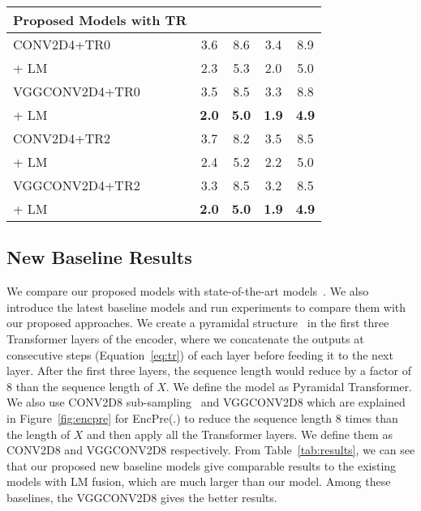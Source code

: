 \documentclass{article}
\begin{document}
\begin{table*}[ht]
\begin{center}
\begin{small}
\begin{sc}
\begin{tabular}{lcccc}
\hline
    Proposed Models with TR &&&& \\ \hline
    CONV2D4+TR0  &3.6 & 8.6 &3.4  & 8.9 \\
    \hspace{0.5cm}   + LM &2.3 &5.3 &2.0 &5.0\\
    VGGCONV2D4+TR0 & 3.5&8.5 & 3.3 & 8.8 \\
    \hspace{0.5cm}   + LM &\textbf{2.0} &\textbf{5.0} &\textbf{1.9} &\textbf{4.9}\\
    CONV2D4+TR2 &3.7 & 8.2 & 3.5 & 8.5 \\
    \hspace{0.5cm}   + LM &2.4 &5.2 &2.2 &5.0\\
    VGGCONV2D4+TR2 &3.3 & 8.5 & 3.2 & 8.5 \\
    \hspace{0.5cm}   + LM &\textbf{2.0} &\textbf{5.0} &\textbf{1.9} &\textbf{4.9}\\
\bottomrule
\end{tabular}
\end{sc}
\end{small}
\end{center}
\vskip -0.1in
\end{table*}

\subsection{New Baseline Results}
We compare our proposed models with  state-of-the-art models~\citep{moritz2020,specaugment,karita2019asru,wang2020a,wang2020b,rwth,e2e2020}. We also introduce the latest baseline models and run experiments to compare them with our proposed approaches. We create a pyramidal structure~\citep{chan2016listen} in the first three Transformer layers of the encoder, where we concatenate the outputs at consecutive steps (Equation~\ref{eq:tr}) of each layer before feeding it to the next layer. After the first three layers, the sequence length would reduce by a factor of 8 than the sequence length of $X$. We define the model as Pyramidal Transformer. We also use CONV2D8 sub-sampling~\citep{espnet} and VGGCONV2D8 which are explained in Figure~\ref{fig:encpre} for EncPre(.) to reduce the sequence length 8 times than the length of $X$ and then apply all the Transformer layers. We define them as  CONV2D8 and VGGCONV2D8 respectively. From Table~\ref{tab:results}, we can see that our proposed new baseline models give comparable results to the existing models with LM fusion, which are much larger than our model. Among these baselines, the VGGCONV2D8 gives the better results. 
\end{document}
